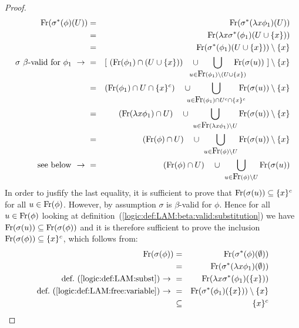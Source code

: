 \begin{proof}
    \begin{eqnarray*}
        \free(\sigma^{*}(\phi)(U))
        &=&\free(\sigma^{*}(\lambda x\phi_{1})(U))\\
        &=&\free(\lambda x\sigma^{*}(\phi_{1})(U\cup\{x\}))\\
        &=&\free(\sigma^{*}(\phi_{1})(U\cup\{x\}))\setminus\{x\}\\
        \mbox{$\sigma$ $\beta$-valid for $\phi_{1}\ \rightarrow\ $}
        &=& [\ (\free(\phi_{1})\cap(U\cup\{x\}))\ \ \ \cup\ 
            \!\!\!\!\!\!\!\!\!\!
            \bigcup_{u\in\free(\phi_{1})\setminus(U\cup\{x\})}
            \!\!\!\!\!\!\!\!\!\!
            \free(\sigma(u))
             \ ]\setminus\{x\}\\
        &=&(\free(\phi_{1})\cap U\cap \{x\}^{c})\ \ \ \cup\ 
            \!\!\!\!\!\!
            \bigcup_{u\in\free(\phi_{1})\cap U^{c}\cap\{x\}^{c}}
            \!\!\!\!\!\!
            \free(\sigma(u))\setminus\{x\}\\
        &=&(\free(\lambda x\phi_{1})\cap U)\ \ \ \cup\ 
            \bigcup_{u\in\free(\lambda x\phi_{1})\setminus U}
            \free(\sigma(u))\setminus\{x\}\\
        &=&(\free(\phi)\cap U)\ \ \ \cup\ \bigcup_{u\in\free(\phi)\setminus U} 
            \free(\sigma(u))\setminus\{x\}\\
        \mbox{see below $\ \rightarrow\ $}
        &=&(\free(\phi)\cap U)\ \ \ 
            \cup\ 
            \bigcup_{u\in\free(\phi)\setminus U}\free(\sigma(u))
    \end{eqnarray*}
In order to jusfify the last equality, it is sufficient to prove
that $\mbox{\rm Fr}(\sigma(u))\subseteq\{x\}^{c}$ for all $u\in\mbox{\rm Fr}(\phi)$.
However, by assumption $\sigma$ is $\beta$-valid for $\phi$. Hence
for all $u\in\mbox{\rm Fr}(\phi)$ looking at 
definition~(\ref{logic:def:LAM:beta:valid:substitution}) we have 
$\mbox{\rm Fr}(\sigma(u))\subseteq\mbox{\rm Fr}(\sigma(\phi))$ and it is therefore 
sufficient to prove the inclusion $\mbox{\rm Fr}(\sigma(\phi))\subseteq\{x\}^{c}$,
which follows from:
    \begin{eqnarray*}
        \mbox{\rm Fr}(\sigma(\phi))
        &=&\mbox{\rm Fr}(\sigma^{*}(\phi)(\emptyset))\\
        &=&\mbox{\rm Fr}(\sigma^{*}(\lambda x\phi_{1})(\emptyset))\\
        \mbox{def.~(\ref{logic:def:LAM:subst})$\ \rightarrow\ $}
        &=&\mbox{\rm Fr}(\lambda x \sigma^{*}(\phi_{1})(\{x\}))\\
        \mbox{def.~(\ref{logic:def:LAM:free:variable})$\ \rightarrow\ $}
        &=&\mbox{\rm Fr}(\sigma^{*}(\phi_{1})(\{x\}))\setminus\{x\}\\
        &\subseteq&\{x\}^{c}
    \end{eqnarray*}
\end{proof}

